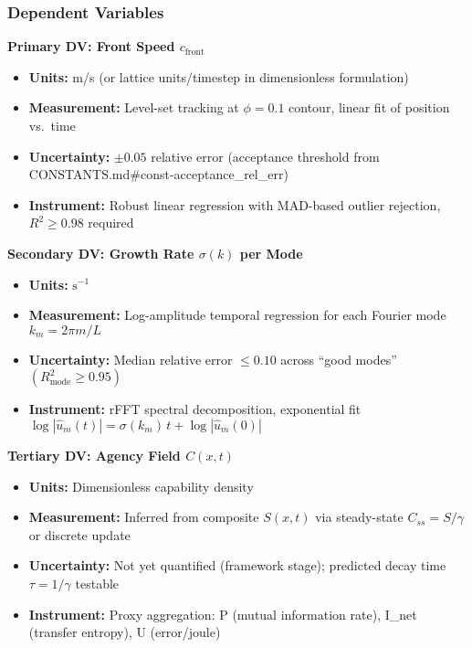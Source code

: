 \documentclass[
]{article}
\providecommand{\tightlist}{%
  \setlength{\itemsep}{0pt}\setlength{\parskip}{0pt}}
\begin{document}
\hypertarget{dependent-variables}{%
\subsubsection{Dependent Variables}\label{dependent-variables}}

\textbf{Primary DV: Front Speed \(c_{\text{front}}\)}

\begin{itemize}
\tightlist
\item
  \textbf{Units:} m/s (or lattice units/timestep in dimensionless
  formulation)
\item
  \textbf{Measurement:} Level-set tracking at \(\phi = 0.1\) contour,
  linear fit of position vs.~time
\item
  \textbf{Uncertainty:} \(\pm 0.05\) relative error (acceptance
  threshold from CONSTANTS.md\#const-acceptance\_rel\_err)
\item
  \textbf{Instrument:} Robust linear regression with MAD-based outlier
  rejection, \(R^{2} \ge 0.98\) required
\end{itemize}

\textbf{Secondary DV: Growth Rate \(\sigma(k)\) per Mode}

\begin{itemize}
\tightlist
\item
  \textbf{Units:} \(\mathrm{s}^{-1}\)
\item
  \textbf{Measurement:} Log-amplitude temporal regression for each
  Fourier mode \(k_m = 2\pi m / L\)
\item
  \textbf{Uncertainty:} Median relative error \(\le 0.10\) across ``good
  modes'' \((R^{2}_{\text{mode}} \ge 0.95)\)
\item
  \textbf{Instrument:} rFFT spectral decomposition, exponential fit
  \(\log|\hat u_m(t)| = \sigma(k_m)\,t + \log|\hat u_m(0)|\)
\end{itemize}

\textbf{Tertiary DV: Agency Field \(C(x,t)\)}

\begin{itemize}
\tightlist
\item
  \textbf{Units:} Dimensionless capability density
\item
  \textbf{Measurement:} Inferred from composite \(S(x,t)\) via
  steady-state \(C_{ss} = S/\gamma\) or discrete update
\item
  \textbf{Uncertainty:} Not yet quantified (framework stage); predicted
  decay time \(\tau = 1/\gamma\) testable
\item
  \textbf{Instrument:} Proxy aggregation: P (mutual information rate),
  I\_net (transfer entropy), U (error/joule)
\end{itemize}
\end{document}
